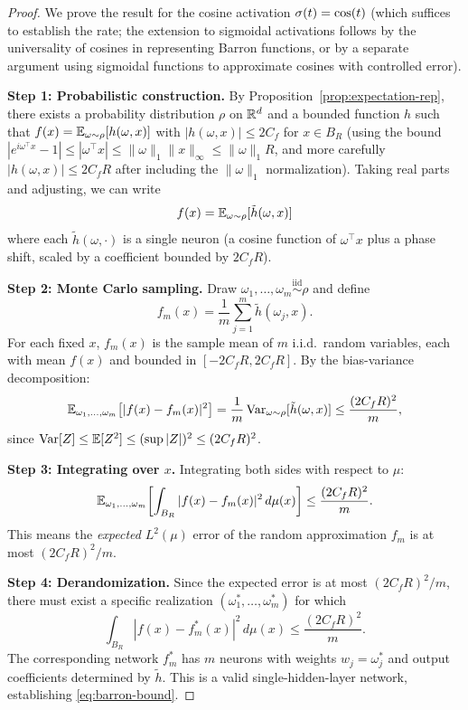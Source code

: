 \documentclass[11pt,a4paper]{article}
\begin{document}
\begin{proof}
We prove the result for the cosine activation $\sigma(t) = \cos(t)$
(which suffices to establish the rate; the extension to sigmoidal
activations follows by the universality of cosines in representing Barron
functions, or by a separate argument using sigmoidal functions to
approximate cosines with controlled error).

\textbf{Step 1: Probabilistic construction.}
By Proposition~\ref{prop:expectation-rep}, there exists a probability
distribution $\rho$ on $\mathbb{R}^d$ and a bounded function $h$ such that
$f(x) = \mathbb{E}_{\omega \sim \rho}[h(\omega, x)]$ with $|h(\omega, x)| \le
2 C_f$ for $x \in B_R$ (using the bound $|e^{i\omega^\top x} - 1| \le
|\omega^\top x| \le \|\omega\|_1 \|x\|_\infty \le \|\omega\|_1 R$, and
more carefully $|h(\omega,x)| \le 2C_f R$ after including the
$\|\omega\|_1$ normalization).  Taking real parts and adjusting, we can
write
\[
  f(x) = \mathbb{E}_{\omega \sim \rho}[\tilde{h}(\omega, x)]
\]
where each $\tilde{h}(\omega, \cdot)$ is a single neuron
(a cosine function of $\omega^\top x$ plus a phase shift, scaled by a
coefficient bounded by $2C_f R$).

\textbf{Step 2: Monte Carlo sampling.}
Draw $\omega_1, \ldots, \omega_m \stackrel{\text{iid}}{\sim} \rho$ and
define
\[
  f_m(x) = \frac{1}{m} \sum_{j=1}^{m} \tilde{h}(\omega_j, x).
\]
For each fixed $x$, $f_m(x)$ is the sample mean of $m$ i.i.d.\ random
variables, each with mean $f(x)$ and bounded in $[-2C_fR, 2C_fR]$.
By the bias-variance decomposition:
\[
  \mathbb{E}_{\omega_1, \ldots, \omega_m}
  \bigl[ |f(x) - f_m(x)|^2 \bigr]
  = \frac{1}{m} \operatorname{Var}_{\omega \sim \rho}[\tilde{h}(\omega, x)]
  \le \frac{(2C_f R)^2}{m},
\]
since $\operatorname{Var}[Z] \le \mathbb{E}[Z^2] \le (\sup |Z|)^2 \le (2C_fR)^2$.

\textbf{Step 3: Integrating over $x$.}
Integrating both sides with respect to $\mu$:
\[
  \mathbb{E}_{\omega_1, \ldots, \omega_m}
  \biggl[ \int_{B_R} |f(x) - f_m(x)|^2 \, d\mu(x) \biggr]
  \le \frac{(2C_fR)^2}{m}.
\]
This means the \emph{expected} $L^2(\mu)$ error of the random
approximation $f_m$ is at most $(2C_fR)^2/m$.

\textbf{Step 4: Derandomization.}
Since the expected error is at most $(2C_fR)^2/m$, there must exist
a specific realization $(\omega_1^*, \ldots, \omega_m^*)$ for which
\[
  \int_{B_R} |f(x) - f_m^*(x)|^2 \, d\mu(x) \le \frac{(2C_fR)^2}{m}.
\]
The corresponding network $f_m^*$ has $m$ neurons with weights
$w_j = \omega_j^*$ and output coefficients determined by $\tilde{h}$.
This is a valid single-hidden-layer network, establishing
\eqref{eq:barron-bound}.
\end{proof}
\end{document}
